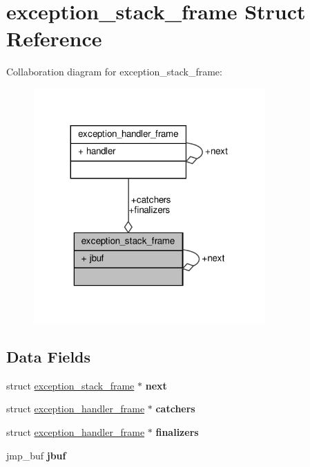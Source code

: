 \hypertarget{structexception__stack__frame}{}\section{exception\+\_\+stack\+\_\+frame Struct Reference}
\label{structexception__stack__frame}


Collaboration diagram for exception\+\_\+stack\+\_\+frame\+:
\nopagebreak
\begin{figure}[H]
\begin{center}
\leavevmode
\includegraphics[width=251pt]{structexception__stack__frame__coll__graph}
\end{center}
\end{figure}
\subsection*{Data Fields}
\begin{DoxyCompactItemize}
\item 
\mbox{\label{structexception__stack__frame_abb538d9a6f6155ed83f140dd2adb7457}} 
struct \hyperlink{structexception__stack__frame}{exception\+\_\+stack\+\_\+frame} $\ast$ {\bfseries next}
\item 
\mbox{\label{structexception__stack__frame_a950ab78cc930f9662ff9cb7eedcfda79}} 
struct \hyperlink{structexception__handler__frame}{exception\+\_\+handler\+\_\+frame} $\ast$ {\bfseries catchers}
\item 
\mbox{\label{structexception__stack__frame_a543e62e78b4b2777e9df32ccc5feba38}} 
struct \hyperlink{structexception__handler__frame}{exception\+\_\+handler\+\_\+frame} $\ast$ {\bfseries finalizers}
\item 
\mbox{\label{structexception__stack__frame_a6f81386a697bcae78000625ee8ba02fa}} 
jmp\+\_\+buf {\bfseries jbuf}
\end{DoxyCompactItemize}


